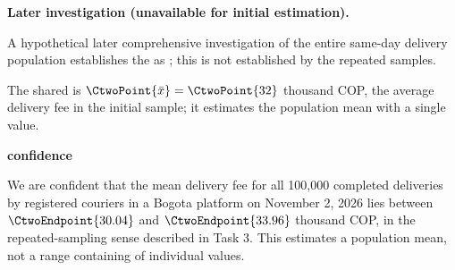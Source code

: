 \textbf{Later investigation (unavailable for initial estimation).}

\begin{probleminfoexcerpt}
A hypothetical later comprehensive investigation of the entire same-day delivery population establishes the   as   ; this is not established by the repeated samples.
\end{probleminfoexcerpt}

The shared  is $\CtwoPoint{\bar x}=\CtwoPoint{32}$ thousand COP, the average delivery fee in the initial sample; it estimates the population mean with a single value.

\textbf{ confidence}




We are  confident that the mean delivery fee for all 100,000 completed deliveries by registered couriers in a Bogota platform on November 2, 2026 lies between $\CtwoEndpoint{30.04}$ and $\CtwoEndpoint{33.96}$ thousand COP, in the repeated-sampling sense described in Task 3. This estimates a population mean, not a range containing  of individual values.

